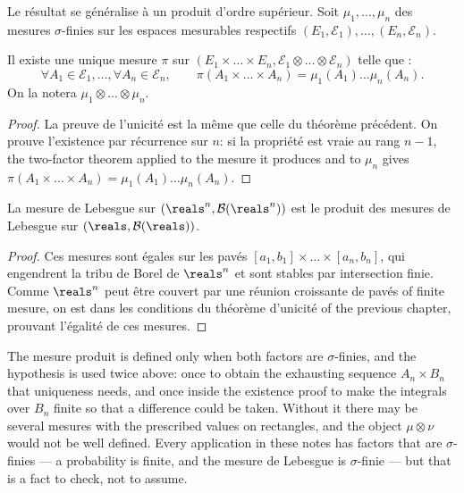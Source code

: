 Le résultat se généralise à un produit d'ordre supérieur. Soit
$\mu_{1},\ldots,\mu_{n}$ des mesures $\sigma$-finies sur les espaces mesurables
respectifs $(E_{1},\mathcal{E}_{1}),\ldots,(E_{n},\mathcal{E}_{n})$.

\begin{theorem}
  Il existe une unique mesure $\pi$ sur $(E_{1} \times \ldots \times E_{n},
  \mathcal{E}_{1} \otimes \ldots \otimes \mathcal{E}_{n})$ telle que :
  \[
    \forall A_{1} \in \mathcal{E}_{1}, \ldots, \forall A_{n} \in \mathcal{E}_{n},
    \qquad
    \pi(A_{1} \times \ldots \times A_{n}) = \mu_{1}(A_{1}) \ldots \mu_{n}(A_{n}) .
  \]
  On la notera $\mu_{1} \otimes \ldots \otimes \mu_{n}$.
\end{theorem}

\begin{proof}
  La preuve de l'unicité est la même que celle du théorème précédent. On prouve
  l'existence par récurrence sur $n$: si la propriété est vraie au rang $n-1$, the
  two-factor theorem applied to the mesure it produces and to $\mu_{n}$ gives
  $\pi(A_{1} \times \ldots \times A_{n}) = \mu_{1}(A_{1}) \ldots \mu_{n}(A_{n})$.
\end{proof}

\begin{corollary}
  La mesure de Lebesgue sur $(\reals^{n},\mathcal{B}(\reals^{n}))$ est le produit des
  mesures de Lebesgue sur $(\reals,\mathcal{B}(\reals))$.
\end{corollary}

\begin{proof}
  Ces mesures sont égales sur les pavés $[a_{1},b_{1}] \times \ldots \times
  [a_{n},b_{n}]$, qui engendrent la tribu de Borel de $\reals^{n}$ et sont stables
  par intersection finie. Comme $\reals^{n}$ peut être couvert par une réunion
  croissante de pavés of finite mesure, on est dans les conditions du théorème
  d'unicité of the previous chapter, prouvant l'égalité de ces mesures.
\end{proof}

\begin{remark}
  The mesure produit is defined only when both factors are $\sigma$-finies, and the
  hypothesis is used twice above: once to obtain the exhausting sequence $A_{n}
  \times B_{n}$ that uniqueness needs, and once inside the existence proof to make
  the integrals over $B_{n}$ finite so that a difference could be taken. Without it
  there may be several mesures with the prescribed values on rectangles, and the
  object $\mu \otimes \nu$ would not be well defined. Every application in these
  notes has factors that are $\sigma$-finies --- a probability is finite, and the
  mesure de Lebesgue is $\sigma$-finie --- but that is a fact to check, not to
  assume.
\end{remark}


